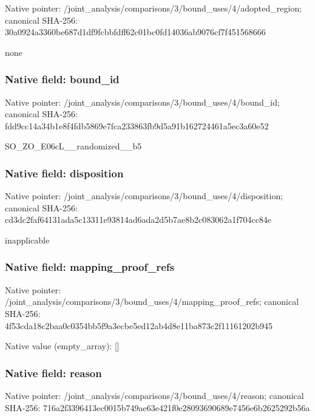 \documentclass[10pt,a4paper]{article}
\begin{document}
Native pointer: /joint\_analysis/comparis\allowbreak{}ons/3/bound\_uses/4/adopt\allowbreak{}ed\_region; canonical SHA-256: 30a0924a3360be687d1df9fc\allowbreak{}bbfdff62c01bc0fd14036ab9\allowbreak{}076cf7f451568666


none


\subsubsection{Native field: bound\_id}


Native pointer: /joint\_analysis/comparis\allowbreak{}ons/3/bound\_uses/4/bound\allowbreak{}\_id; canonical SHA-256: fdd9cc14a34b1e8f4fdb5869\allowbreak{}e7fca233863fb9d5a91b1627\allowbreak{}24461a5ec3a60e52


SO\_ZO\_E06cL\_\_randomized\_\_b5


\subsubsection{Native field: disposition}


Native pointer: /joint\_analysis/comparis\allowbreak{}ons/3/bound\_uses/4/dispo\allowbreak{}sition; canonical SHA-256: cd3dc2faf64131ada5c13311\allowbreak{}e93814ad6ada2d5b7ae8b2c0\allowbreak{}83062a1f704cc84e


inapplicable


\subsubsection{Native field: mapping\_proof\_refs}


Native pointer: /joint\_analysis/comparis\allowbreak{}ons/3/bound\_uses/4/mappi\allowbreak{}ng\_proof\_refs; canonical SHA-256: 4f53cda18c2baa0c0354bb5f\allowbreak{}9a3ecbe5ed12ab4d8e11ba87\allowbreak{}3c2f11161202b945



Native value (empty\_array): []



\subsubsection{Native field: reason}


Native pointer: /joint\_analysis/comparis\allowbreak{}ons/3/bound\_uses/4/reaso\allowbreak{}n; canonical SHA-256: 716a2f3396413ec0015b749a\allowbreak{}e63e421f0e28093690689e74\allowbreak{}56e6b2625292b56a
\end{document}
